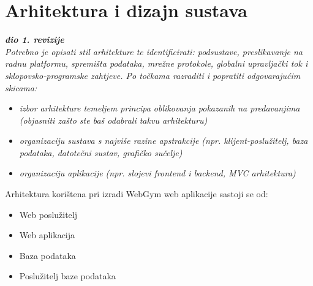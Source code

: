 \chapter{Arhitektura i dizajn sustava}
		
		\textbf{\textit{dio 1. revizije}}\\

		\textit{ Potrebno je opisati stil arhitekture te identificirati: podsustave, preslikavanje na radnu platformu, spremišta podataka, mrežne protokole, globalni upravljački tok i sklopovsko-programske zahtjeve. Po točkama razraditi i popratiti odgovarajućim skicama:}
	\begin{itemize}
		\item 	\textit{izbor arhitekture temeljem principa oblikovanja pokazanih na predavanjima (objasniti zašto ste baš odabrali takvu arhitekturu)}
		\item 	\textit{organizaciju sustava s najviše razine apstrakcije (npr. klijent-poslužitelj, baza podataka, datotečni sustav, grafičko sučelje)}
		\item 	\textit{organizaciju aplikacije (npr. slojevi frontend i backend, MVC arhitektura) }		
	\end{itemize}
	
	Arhitektura korištena pri izradi WebGym web aplikacije sastoji se od:
	\begin{itemize}
		\item   Web poslužitelj
		\item 	Web aplikacija
		\item 	Baza podataka
		\item   Poslužitelj baze podataka	
	\end{itemize}
	
